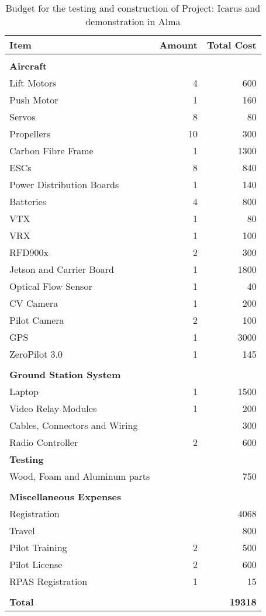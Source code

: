 \begin{table}[h]
\centering
\begin{tabular}{lrr}
\color{hyperrideblue} \textbf{Item} &
\color{hyperrideblue} \textbf{Amount} &
\color{hyperrideblue} \textbf{Total Cost} \\ \midrule
& & \\
\color{hyperrideblue} \textbf{Aircraft} &  &  \\ \midrule
Lift Motors & 4 & 600 \\
Push Motor & 1 & 160 \\
Servos & 8 & 80 \\
Propellers & 10 & 300 \\
Carbon Fibre Frame & 1 & 1300 \\
ESCs & 8 & 840 \\
Power Distribution Boards & 1 & 140 \\
Batteries & 4 & 800 \\
VTX & 1 & 80 \\
VRX & 1 & 100 \\
RFD900x & 2 & 300 \\
Jetson and Carrier Board & 1 & 1800 \\
Optical Flow Sensor & 1 & 40 \\
CV Camera & 1 & 200 \\
Pilot Camera & 2 & 100 \\
GPS & 1 & 3000 \\
ZeroPilot 3.0 & 1 & 145 \\
& & \\
\color{hyperrideblue} \textbf{Ground Station System} &  &  \\ \midrule
Laptop & 1 & 1500 \\
Video Relay Modules & 1 & 200 \\
Cables, Connectors and Wiring &  & 300 \\
Radio Controller & 2 & 600 \\
\color{hyperrideblue} \textbf{Testing} &  &  \\
Wood, Foam and Aluminum parts &  & 750 \\
& & \\
\color{hyperrideblue} \textbf{Miscellaneous Expenses} &  &  \\ \midrule
Registration & & 4068 \\
Travel &  & 800 \\
Pilot Training & 2 & 500 \\
Pilot License & 2 & 600 \\
RPAS Registration & 1 & 15 \\
& & \\ \midrule
\color{hyperrideblue} \textbf{Total} & \textbf{} & \textbf{19318}
\end{tabular}
\caption{Budget for the testing and construction of Project: Icarus and demonstration in
Alma}
\end{table}

\clearpage

